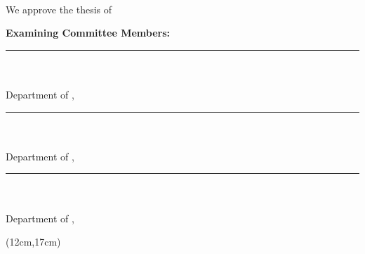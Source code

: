 ~\pagebreak

\thispagestyle{empty}

\begin{spacing}{1}
	\noindent We approve the thesis of
	\textbf{\AuthorName{ }\MakeUppercase\AuthorSurname}
	\vspace{0.5cm}

	\noindent\textbf{Examining Committee Members:}
	\vspace{0.5cm}

	\noindent\rule{5cm}{0.1mm}\\
	\textbf{\CommitteeMemberOneTitle{ }\CommitteeMemberOneName{}
	\MakeUppercase\CommitteeMemberOneSurname}\\
	Department of \CommitteeMemberOneDepartment, \CommitteeMemberOneUniversity
	\vspace{0.5cm}

	\noindent\rule{5cm}{0.1mm}\\
	\textbf{\CommitteeMemberTwoTitle{ }\CommitteeMemberTwoName{}
	\MakeUppercase\CommitteeMemberTwoSurname}\\
	Department of \CommitteeMemberTwoDepartment, \CommitteeMemberTwoUniversity
	\vspace{0.5cm}

	\noindent\rule{5cm}{0.1mm}\\
	\textbf{\CommitteeMemberThreeTitle{ }\CommitteeMemberThreeName{}
	\MakeUppercase\CommitteeMemberThreeSurname}\\
	Department of \CommitteeMemberThreeDepartment, \CommitteeMemberThreeUniversity
	\vspace{0.5cm}


	
	\begin{textblock*}{\textwidth}(12cm,17cm)
		\textbf{\ApprovalPageDate}
	\end{textblock*}


\end{spacing}

